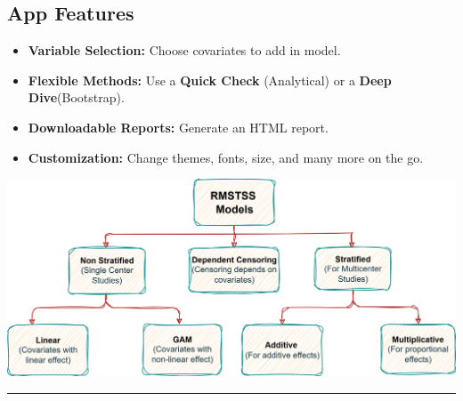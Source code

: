 \documentclass[a0,landscape]{a0poster}
\begin{document}
\begin{minipage}[t]{0.54\linewidth}
    \subsection*{\color{HeadingColor}\huge App Features}
    \begin{itemize}
        \item[{\color{BulletColor}\Large\checkmark}] \Large \textbf{Variable Selection:} Choose covariates to add in model.
        \item[{\color{BulletColor}\Large\checkmark}] \Large \textbf{Flexible Methods:} Use a \textbf{Quick Check} (Analytical) or a \textbf{Deep Dive}(Bootstrap).
        \item[{\color{BulletColor}\Large\checkmark}] \Large \textbf{Downloadable Reports:} Generate an HTML report.
        \item[{\color{BulletColor}\Large\checkmark}] \Large \textbf{Customization:} Change themes, fonts, size, and many more on the go.
    \end{itemize}
\vspace{2cm}    
\hfill
    {\centering \includegraphics[width=\linewidth,height = 0.6\linewidth]{images/app-models.png}\par}
\end{minipage}

\hfill
\rule{\linewidth}{2.5pt} %
\end{document}
